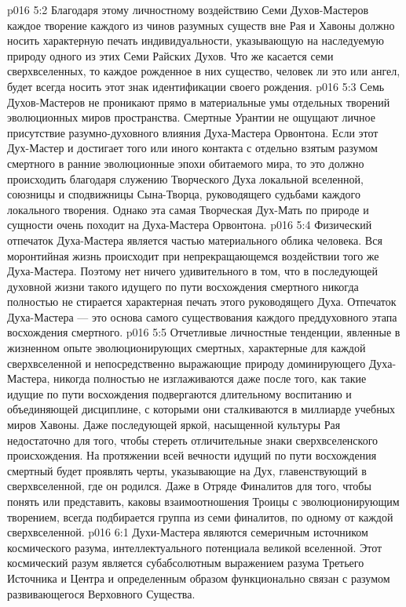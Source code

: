 \vs p016 5:2 Благодаря этому личностному воздействию Семи Духов\hyp{}Мастеров каждое творение каждого из чинов разумных существ вне Рая и Хавоны должно носить характерную печать индивидуальности, указывающую на наследуемую природу одного из этих Семи Райских Духов. Что же касается семи сверхвселенных, то каждое рожденное в них существо, человек ли это или ангел, будет всегда носить этот знак идентификации своего рождения.
\vs p016 5:3 Семь Духов\hyp{}Мастеров не проникают прямо в материальные умы отдельных творений эволюционных миров пространства. Смертные Урантии не ощущают личное присутствие разумно\hyp{}духовного влияния Духа\hyp{}Мастера Орвонтона. Если этот Дух\hyp{}Мастер и достигает того или иного контакта с отдельно взятым разумом смертного в ранние эволюционные эпохи обитаемого мира, то это должно происходить благодаря служению Творческого Духа локальной вселенной, союзницы и сподвижницы Сына\hyp{}Творца, руководящего судьбами каждого локального творения. Однако эта самая Творческая Дух\hyp{}Мать по природе и сущности очень походит на Духа\hyp{}Мастера Орвонтона.
\vs p016 5:4 Физический отпечаток Духа\hyp{}Мастера является частью материального облика человека. Вся моронтийная жизнь происходит при непрекращающемся воздействии того же Духа\hyp{}Мастера. Поэтому нет ничего удивительного в том, что в последующей духовной жизни такого идущего по пути восхождения смертного никогда полностью не стирается характерная печать этого руководящего Духа. Отпечаток Духа\hyp{}Мастера --- это основа самого существования каждого преддуховного этапа восхождения смертного.
\vs p016 5:5 Отчетливые личностные тенденции, явленные в жизненном опыте эволюционирующих смертных, характерные для каждой сверхвселенной и непосредственно выражающие природу доминирующего Духа\hyp{}Мастера, никогда полностью не изглаживаются даже после того, как такие идущие по пути восхождения подвергаются длительному воспитанию и объединяющей дисциплине, с которыми они сталкиваются в миллиарде учебных миров Хавоны. Даже последующей яркой, насыщенной культуры Рая недостаточно для того, чтобы стереть отличительные знаки сверхвселенского происхождения. На протяжении всей вечности идущий по пути восхождения смертный будет проявлять черты, указывающие на Дух, главенствующий в сверхвселенной, где он родился. Даже в Отряде Финалитов для того, чтобы понять или представить, каковы  взаимоотношения Троицы с эволюционирующим творением, всегда подбирается группа из семи финалитов, по одному от каждой сверхвселенной.
\vs p016 6:1 Духи\hyp{}Мастера являются семеричным источником космического разума, интеллектуального потенциала великой вселенной. Этот космический разум является субабсолютным выражением разума Третьего Источника и Центра и определенным образом функционально связан с разумом развивающегося Верховного Существа.

